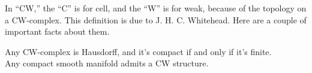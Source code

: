 In ``CW,'' the ``C'' is for cell, and the ``W'' is for weak, because of the topology on a CW-complex. This definition is due to J. H. C. Whitehead. Here are a couple of important facts about them. 
\begin{theorem}
Any CW-complex is Hausdorff, and it's compact if and only if it's finite. \\
Any compact smooth manifold admits a CW structure.
\end{theorem}

